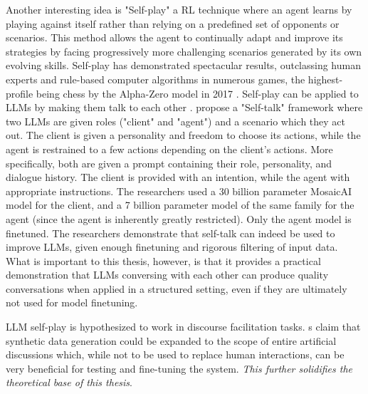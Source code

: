 Another interesting idea is "Self-play" a \ac{RL} technique where an agent learns by playing against itself rather than relying on a predefined set of opponents or scenarios. This method allows the agent to continually adapt and improve its strategies by facing progressively more challenging scenarios generated by its own evolving skills. Self-play has demonstrated spectacular results, outclassing human experts and rule-based computer algorithms in numerous games, the highest-profile being chess by the Alpha-Zero model in 2017 \cite{silver2017masteringchessshogiselfplay}. Self-play can be applied to LLMs by making them talk to each other \cite{cheng2024selfplayingadversariallanguagegame}.  \citet{ulmer2024bootstrappingllmbasedtaskorienteddialogue} propose a "Self-talk" framework where two LLMs are given roles ("client" and "agent") and a scenario which they act out. The client is given a personality and freedom to choose its actions, while the agent is restrained to a few actions depending on the client's actions. More specifically, both are given a prompt containing their role, personality, and dialogue history. The client is provided with an intention, while the agent with appropriate instructions. The researchers used a 30 billion parameter MosaicAI \cite{MosaicML2023} model for the client, and a 7 billion parameter model of the same family for the agent (since the agent is inherently greatly restricted). Only the agent model is finetuned. The researchers demonstrate that self-talk can indeed be used to improve LLMs, given enough finetuning and rigorous filtering of input data. What is important to this thesis, however, is that it provides a practical demonstration that LLMs conversing with each other can produce quality conversations when applied in a structured setting, even if they are ultimately not used for model finetuning.

LLM self-play is hypothesized to work in discourse facilitation tasks. \citet{small-polis-llm}s claim that synthetic data generation could be expanded to the scope of entire artificial discussions which, while not to be used to replace human interactions, can be very beneficial for testing and fine-tuning the system. \textit{This further solidifies the theoretical base of this thesis}. 

